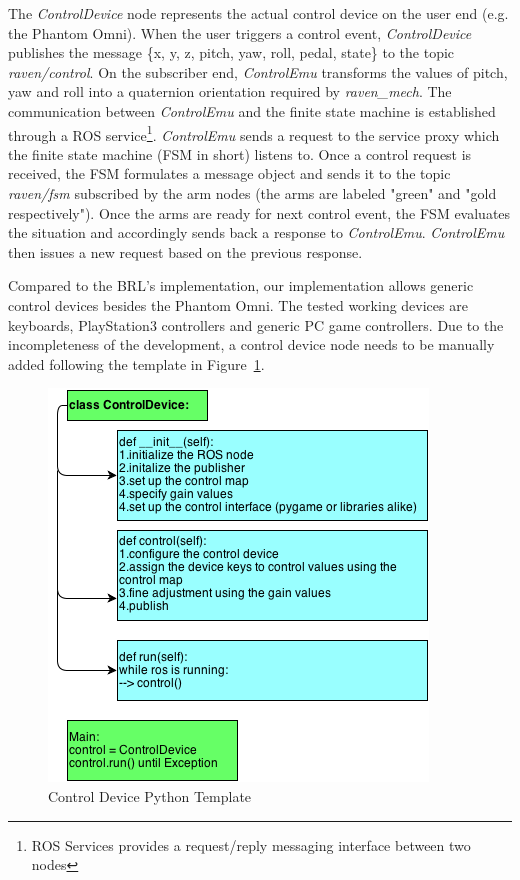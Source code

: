 \documentclass[letterpaper,twocolumn,10pt]{article}
\begin{document}
The \emph{ControlDevice} node represents the actual control device on
the user end (e.g. the Phantom Omni). When the user triggers a control
event, \emph{ControlDevice} publishes the message \{x, y, z, pitch,
yaw, roll, pedal, state\} to the topic \emph{raven/control}. On the
subscriber end, \emph{ControlEmu} transforms the values of pitch, yaw
and roll into a quaternion orientation required by
\emph{raven\_mech}. The communication between \emph{ControlEmu} and
the finite state machine is established through a ROS
service\footnote{ROS Services provides a request/reply messaging
  interface between two nodes}. \emph{ControlEmu} sends a request to
the service proxy which the finite state machine (FSM in short)
listens to. Once a control request is received, the FSM formulates a
message object and sends it to the topic \emph{raven/fsm} subscribed
by the arm nodes (the arms are labeled "green" and "gold
respectively"). Once the arms are ready for next control event, the
FSM evaluates the situation and accordingly sends back a response to
\emph{ControlEmu}. \emph{ControlEmu} then issues a new request based
on the previous response.

Compared to the BRL's implementation, our implementation allows
generic control devices besides the Phantom Omni. The tested working
devices are keyboards, PlayStation3 controllers and generic PC game
controllers. Due to the incompleteness of the development, a control
device node needs to be manually added following the template in
Figure~\ref{fig:control_device_template}.

\begin{figure}[h!]
  \includegraphics[width=1.0\columnwidth]{ControlDeviceTemplate.png}
  \caption{Control Device Python Template}
  \label{fig:control_device_template}
\end{figure}
\end{document}

